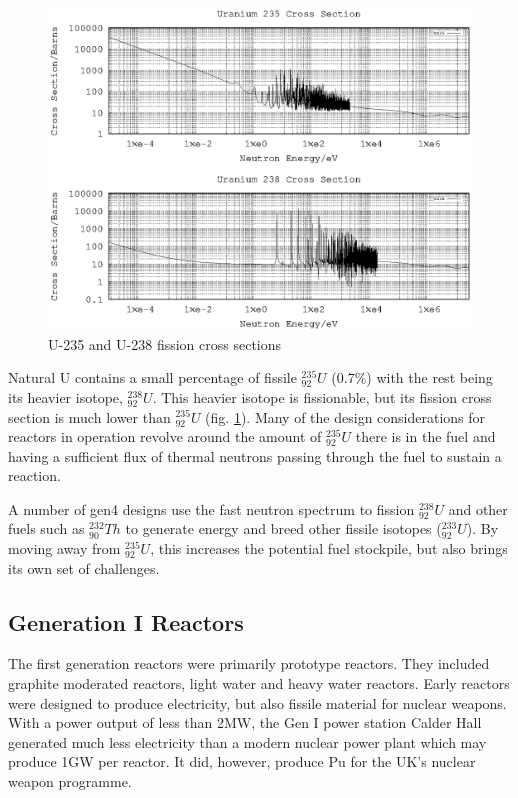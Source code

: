 \begin{figure}[tbp]
  \begin{center}
    \includegraphics[width=.8\linewidth]{chapters/introduction/plots/uranium_cross_section/u_xs}%
    \caption{U-235 and U-238 fission cross sections}
    \label{figure:u235u238fissionxs}
  \end{center}
\end{figure}

Natural U contains a small percentage of fissile ${}^{235}_{92}U$ (0.7\%) with the rest being its heavier isotope, ${}^{238}_{92}U$.  This heavier isotope is \gls{fissionable}, but its fission cross section is much lower than ${}^{235}_{92}U$ (fig. \ref{figure:u235u238fissionxs}).  Many of the design considerations for reactors in operation revolve around the amount of ${}^{235}_{92}U$ there is in the fuel and having a sufficient flux of thermal neutrons passing through the fuel to sustain a reaction.

A number of \acrshort{gen4} designs use the fast neutron spectrum to fission ${}^{238}_{92}U$ and other fuels such as ${}^{232}_{90}Th$ to generate energy and breed other fissile isotopes (${}^{233}_{92}U$).  By moving away from ${}^{235}_{92}U$, this increases the potential fuel stockpile, but also brings its own set of challenges.


\FloatBarrier

\subsection{Generation I Reactors}

The first generation reactors were primarily prototype reactors.  They included graphite moderated reactors, light water and heavy water reactors.  Early reactors were designed to produce electricity, but also fissile material for nuclear weapons.  With a power output of less than 2MW, the Gen I power station Calder Hall generated much less electricity than a modern nuclear power plant which may produce 1GW per reactor.  It did, however, produce \Gls{Pu} for the UK's nuclear weapon programme.

